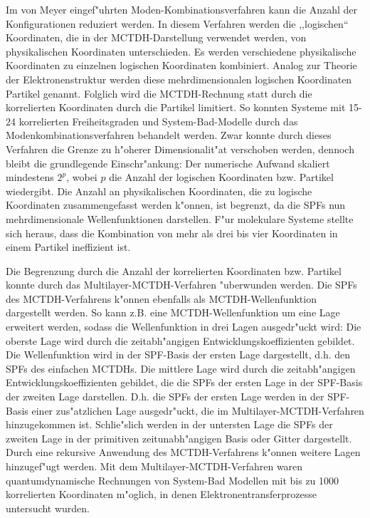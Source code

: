  Im von Meyer eingef"uhrten Moden-Kombinationsverfahren kann die Anzahl der Konfigurationen reduziert werden.
In diesem Verfah\-ren werden die ,,logischen`` Koordinaten, die in der MCTDH-Darstellung verwendet werden, von physikalischen Koordinaten unterschieden. 
Es werden verschiedene physikalische Koordinaten zu einzelnen logischen Koordinaten kombiniert.
Analog zur Theorie der Elektronenstruktur werden diese mehrdimensionalen logischen Koordinaten Partikel genannt. 
Folglich wird die MCTDH-Rechnung statt durch die korrelierten Koordinaten durch die Partikel limitiert. 
So konnten Systeme  mit 15-24 korrelierten Freiheitsgraden \cite{H5O2+MCTDH2, H5O2+MCTDH3, RWMC, CWMC}
und System-Bad-Modelle \cite{W, WTM, NM2} durch das Modenkombinationsverfahren behandelt werden.
Zwar konnte durch dieses Verfahren die Grenze zu h"oherer Dimensionalit"at verschoben werden,
 dennoch bleibt die grundlegende Einschr"ankung: Der numerische Aufwand skaliert mindestens $2^p$, wobei $ p $ die Anzahl der logischen Koordinaten bzw.
 Partikel wiedergibt. Die Anzahl an physikalischen Koordinaten, die zu logische Koordinaten zusammengefasst werden k"onnen, ist begrenzt, da die SPFs
 nun mehrdimensionale Wellenfunktionen darstellen. F"ur molekulare Systeme stellte sich heraus, dass die Kombination von mehr als drei bis vier Koordinaten in einem Partikel
ineffizient ist.

Die Begrenzung durch die Anzahl der korrelierten Koordinaten bzw. Partikel konnte durch das Multilayer-MCTDH-Verfahren \cite{WT3} "uberwunden werden.
Die SPFs des MCTDH-Verfahrens k"onnen ebenfalls als MCTDH-Wellenfunktion dargestellt werden.
So kann z.B. eine MCTDH-Wellenfunktion um eine Lage erweitert werden, sodass die Wellenfunktion in drei Lagen ausgedr"uckt wird:
Die oberste Lage wird durch die zeitabh"angigen Entwicklungskoeffizienten gebildet. Die Wellenfunktion wird in der SPF-Basis der ersten Lage dargestellt, d.h.
den SPFs des einfachen MCTDHs. Die mittlere Lage wird durch die zeitabh"angigen Entwicklungskoeffizienten gebildet, die die SPFs der ersten Lage in der
SPF-Basis der zweiten Lage darstellen.
D.h. die SPFs der ersten Lage werden in der SPF-Basis einer zus"atzlichen Lage ausgedr"uckt, die im Multilayer-MCTDH-Verfahren hinzugekommen ist. 
Schlie"slich werden in der untersten Lage die SPFs der zweiten Lage in der primitiven zeitunabh"angigen Basis oder Gitter dargestellt.
Durch eine rekursive Anwendung des MCTDH-Verfahrens k"onnen weitere Lagen hinzugef"ugt werden.
Mit dem Multilayer-MCTDH-Verfahren waren quantumdynamische Rechnungen von System-Bad Modellen mit bis zu 1000 korrelierten Koordinaten m"oglich,
in denen Elektronentransferprozesse \cite{WT3, WST} untersucht wurden.

